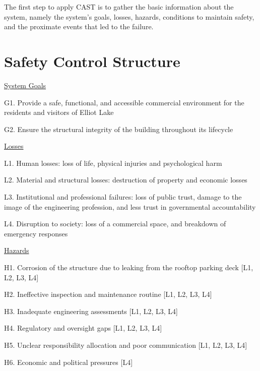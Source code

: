 \documentclass[12pt]{article}
\begin{document}
The first step to apply CAST is to gather the basic information about the system, namely the system's goals, losses, hazards, conditions to maintain safety, and the proximate events that led to the failure. 


\section{Safety Control Structure}



\underline{System Goals}

G1. Provide a safe, functional, and accessible commercial environment for the residents and visitors of Elliot Lake

G2. Ensure the structural integrity of the building throughout its lifecycle

\underline{Losses}

L1. Human losses: loss of life, physical injuries and psychological harm

L2. Material and structural losses: destruction of property and economic losses

L3. Institutional and professional failures: loss of public trust, damage to the image of the engineering profession, and less trust in governmental accountability

L4. Disruption to society: loss of a commercial space, and breakdown of emergency responses

\underline{Hazards}

H1. Corrosion of the structure due to leaking from the rooftop parking deck [L1, L2, L3, L4]

H2. Ineffective inspection and maintenance routine [L1, L2, L3, L4]

H3. Inadequate engineering assessments [L1, L2, L3, L4]

H4. Regulatory and oversight gaps [L1, L2, L3, L4]

H5. Unclear responsibility allocation and poor communication [L1, L2, L3, L4]

H6. Economic and political pressures [L4]
\end{document}
